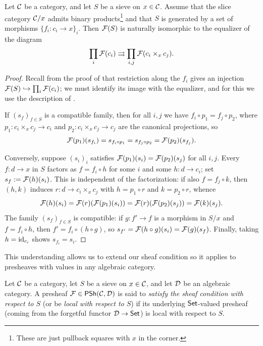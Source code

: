 \startlecture[Sep 29, 2026]

\begin{proposition}\label{prop:chap:sheaves:sec:sites:sheaf condition as equalizer}
    Let $\catC$ be a category, and let $S$ be a sieve on $x \in \catC$. Assume that the slice category $\catC/x$ admits binary products\footnote{These are just pullback squares with $x$ in the corner.} and that $S$ is generated by a set of morphisms $\{f_i : c_i \to x\}_i$. Then $\cal{F}(S)$ is naturally isomorphic to the equalizer of the diagram
    \[\prod_{i} \cal{F}(c_i) \rightrightarrows \prod_{i,j} \cal{F}(c_i \times_x c_j).\]
\end{proposition}
\begin{proof}
    Recall from the proof of  that restriction along the $f_i$ gives an injection $\cal{F}(S) \hookrightarrow \prod_i \cal{F}(c_i)$; we must identify its image with the equalizer, and for this we use the description of .

    If $(s_f)_{f \in S}$ is a compatible family, then for all $i,j$ we have $f_i \circ p_1 = f_j \circ p_2$, where $p_1 : c_i \times_x c_j \to c_i$ and $p_2 : c_i \times_x c_j \to c_j$ are the canonical projections, so
    \[\cal{F}(p_1)(s_{f_i}) = s_{f_i \circ p_1} = s_{f_j \circ p_2} = \cal{F}(p_2)(s_{f_j}).\]

    Conversely, suppose $(s_i)_i$ satisfies $\cal{F}(p_1)(s_i) = \cal{F}(p_2)(s_j)$ for all $i,j$. Every $f : d \to x$ in $S$ factors as $f = f_i \circ h$ for some $i$ and some $h : d \to c_i$; set $s_f := \cal{F}(h)(s_i)$. This is independent of the factorization: if also $f = f_j \circ k$, then $(h,k)$ induces $r : d \to c_i \times_x c_j$ with $h = p_1 \circ r$ and $k = p_2 \circ r$, whence
    \[\cal{F}(h)(s_i) = \cal{F}(r)(\cal{F}(p_1)(s_i)) = \cal{F}(r)(\cal{F}(p_2)(s_j)) = \cal{F}(k)(s_j).\]
    The family $(s_f)_{f \in S}$ is compatible: if $g : f' \to f$ is a morphism in $S/x$ and $f = f_i \circ h$, then $f' = f_i \circ (h \circ g)$, so $s_{f'} = \cal{F}(h \circ g)(s_i) = \cal{F}(g)(s_f)$. Finally, taking $h = \id_{c_i}$ shows $s_{f_i} = s_i$.
\end{proof}

This understanding allows us to extend our sheaf condition so it applies to presheaves with values in any algebraic category.

\begin{definition}\label{def:chap:sheaves:sec:sites:local with respect to a sieve in algebraic category}
    Let $\catC$ be a category, let $S$ be a sieve on $x \in \catC$, and let $\catD$ be an algebraic category. A presheaf $\cal{F} \in \PSh(\catC,\catD)$ is said to \emph{satisfy the sheaf condition with respect to $S$} (or be \emph{local with respect to $S$}) if its underlying $\Set$-valued presheaf (coming from the forgetful functor $\catD \to \Set$) is local with respect to $S$.
\end{definition}

